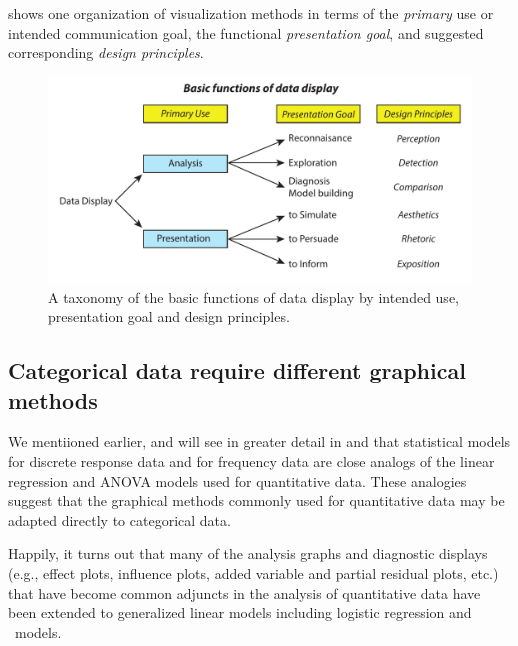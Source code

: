 \documentclass[11pt]{book}\usepackage[]{graphicx}\usepackage[]{color}
\begin{document}
shows one organization of visualization methods in terms
of the \emph{primary} use or intended communication goal,
the functional \emph{presentation goal}, and suggested corresponding
\emph{design principles}.
\begin{figure}[htbp]
  \centering 
  \includegraphics[width=\textwidth]{ch01/fig/datadisp}
  \caption[Basic functions of data display]{A taxonomy of the basic functions of data display by intended use, presentation goal and design principles.}\label{fig:datadisp}
\end{figure}


\subsection{Categorical data require different graphical methods}\label{sec:intro-catdata}

We mentiioned earlier, and will see in greater detail 
in  and 
that statistical models for discrete
response data and for frequency 
data are close analogs of the linear regression and ANOVA models
used for quantitative data.
These analogies suggest that the graphical methods
commonly used for quantitative data may be adapted directly to
categorical data.

Happily, it turns out that many of the analysis graphs and diagnostic
displays (e.g., effect plots,
influence plots, added variable and partial residual
plots, etc.)
that have become common adjuncts in the analysis of
quantitative data have been extended to generalized linear models
including logistic regression and \loglin\ models.
\end{document}
